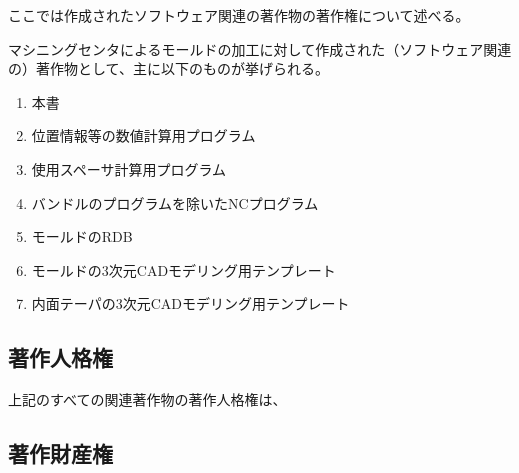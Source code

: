 

ここでは作成されたソフトウェア関連の著作物の著作権について述べる。


マシニングセンタによるモールドの加工に対して作成された（ソフトウェア関連の）著作物として、主に以下のものが挙げられる。
\begin{enumerate}
\item 本書
\item 位置情報等の数値計算用プログラム
\item 使用スペーサ計算用プログラム
\item バンドルのプログラムを除いたNCプログラム
\item モールドのRDB
\item モールドの3次元CADモデリング用テンプレート
\item 内面テーパの3次元CADモデリング用テンプレート
\end{enumerate}





\subsection{著作人格権\TBW}
上記のすべての関連著作物の著作人格権は、


\subsection{著作財産権\TBW}

